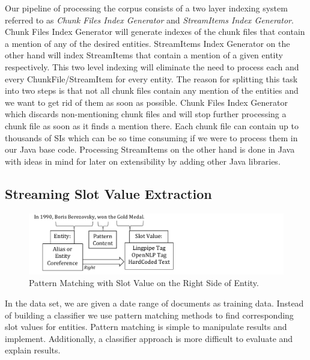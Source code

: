 Our pipeline of processing the corpus consists of a two layer indexing system referred to as \textit{Chunk Files Index Generator} and \textit{StreamItems Index Generator}. Chunk Files Index Generator will generate indexes of the chunk files that contain a mention of any of the desired entities. StreamItems Index Generator 
on the other hand will index StreamItems that contain a mention of a given entity respectively. This two level indexing will eliminate the need to process each and every ChunkFile/StreamItem for every entity. The reason for splitting this task into two steps is that not all chunk files contain any mention of the entities and 
we want to get rid of them as soon as possible. Chunk Files Index Generator which discards non-mentioning chunk files and will stop further processing a chunk file as soon as it finds a mention there. Each chunk file can contain up to thousands of SIs which can be so time consuming if we were to process them in our Java base code. Processing StreamItems on the other hand is done in Java with ideas in mind for later on extensibility by adding other Java libraries.



\subsection{Streaming Slot Value Extraction}
\label{sec:ssve}
\begin{figure}
\centering
\includegraphics[width = 13cm]{./images/Pattern-crop.pdf}
\vspace*{-.1in} \caption{Pattern Matching with Slot Value on the Right Side of Entity. }\label{fig:pattern}
\vspace*{-.2in}
\end{figure}

In the data set, we are given a date range of documents as training data. Instead of building a classifier we use pattern matching methods to find corresponding slot values for entities. 
Pattern matching is simple to manipulate results and implement. Additionally, a classifier approach is more difficult to evaluate and explain results.

